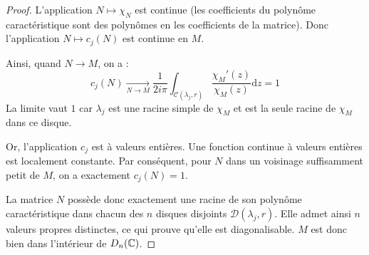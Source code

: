 \begin{proof}
    L'application $N \mapsto \chi_N$ est continue (les coefficients du polynôme caractéristique sont des polynômes en les coefficients de la matrice). Donc l'application $N \mapsto c_j(N)$ est continue en $M$. 
    
    Ainsi, quand $N \to M$, on a :
    \[ c_j(N) \xrightarrow[N \to M]{} \frac{1}{2i\pi} \int_{\mathcal{C}(\lambda_j, r)} \frac{\chi_M'(z)}{\chi_M(z)} \mathrm{d}z = 1 \]
    La limite vaut $1$ car $\lambda_j$ est une racine simple de $\chi_M$ et est la seule racine de $\chi_M$ dans ce disque.
    
    Or, l'application $c_j$ est à valeurs entières. Une fonction continue à valeurs entières est localement constante. Par conséquent, pour $N$ dans un voisinage suffisamment petit de $M$, on a exactement $c_j(N) = 1$.
    
    La matrice $N$ possède donc exactement une racine de son polynôme caractéristique dans chacun des $n$ disques disjoints $\mathcal{D}(\lambda_j, r)$. Elle admet ainsi $n$ valeurs propres distinctes, ce qui prouve qu'elle est diagonalisable. $M$ est donc bien dans l'intérieur de $D_n(\mathbb{C})$.
\end{proof}

